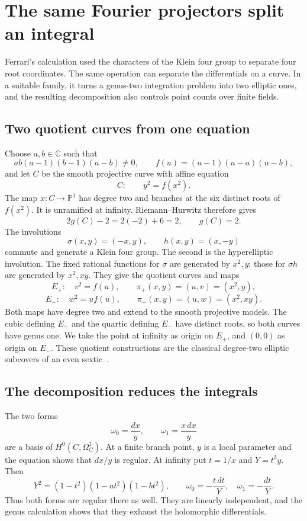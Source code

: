 \documentclass[11pt]{article}
\theoremstyle{remark}
\newcommand{\C}{\mathbb C}
\begin{document}
\section{The same Fourier projectors split an integral}
\label{geometry:genus-two}

Ferrari's calculation used the characters of the Klein four group to separate four root coordinates. The same operation can separate the differentials on a curve. In a suitable family, it turns a genus-two integration problem into two elliptic ones, and the resulting decomposition also controls point counts over finite fields.

\subsection{Two quotient curves from one equation}

Choose \(a,b\in\C\) such that
\[
ab(a-1)(b-1)(a-b)\ne0,
\qquad f(u)=(u-1)(u-a)(u-b),
\]
and let \(C\) be the smooth projective curve with affine equation
\begin{equation}
C:\qquad y^2=f(x^2).
\label{geometry:genus-two-equation}
\end{equation}
The map \(x:C\to\mathbb P^1\) has degree two and branches at the six distinct roots of \(f(x^2)\). It is unramified at infinity. Riemann--Hurwitz therefore gives
\[
2g(C)-2=2(-2)+6=2,
\qquad g(C)=2.
\]
The involutions
\[
\sigma(x,y)=(-x,y),\qquad h(x,y)=(x,-y)
\]
commute and generate a Klein four group. The second is the hyperelliptic involution. The fixed rational functions for \(\sigma\) are generated by \(x^2,y\); those for \(\sigma h\) are generated by \(x^2,xy\). They give the quotient curves and maps
\[
E_+:\quad v^2=f(u),\qquad
\pi_+(x,y)=(u,v)=(x^2,y),
\]
\[
E_-:\quad w^2=u f(u),\qquad
\pi_-(x,y)=(u,w)=(x^2,xy).
\]
Both maps have degree two and extend to the smooth projective models. The cubic defining \(E_+\) and the quartic defining \(E_-\) have distinct roots, so both curves have genus one. We take the point at infinity as origin on \(E_+\), and \((0,0)\) as origin on \(E_-\). These quotient constructions are the classical degree-two elliptic subcovers of an even sextic~\cite{shaska-split}.

\subsection{The decomposition reduces the integrals}

The two forms
\[
\omega_0=\frac{dx}{y},\qquad \omega_1=\frac{x\,dx}{y}
\]
are a basis of \(H^0(C,\Omega_C^1)\). At a finite branch point, \(y\) is a local parameter and the equation shows that \(dx/y\) is regular. At infinity put \(t=1/x\) and \(Y=t^3y\). Then
\[
Y^2=(1-t^2)(1-at^2)(1-bt^2),
\qquad
\omega_0=-\frac{t\,dt}{Y},\quad
\omega_1=-\frac{dt}{Y}.
\]
Thus both forms are regular there as well. They are linearly independent, and the genus calculation shows that they exhaust the holomorphic differentials.
\end{document}
